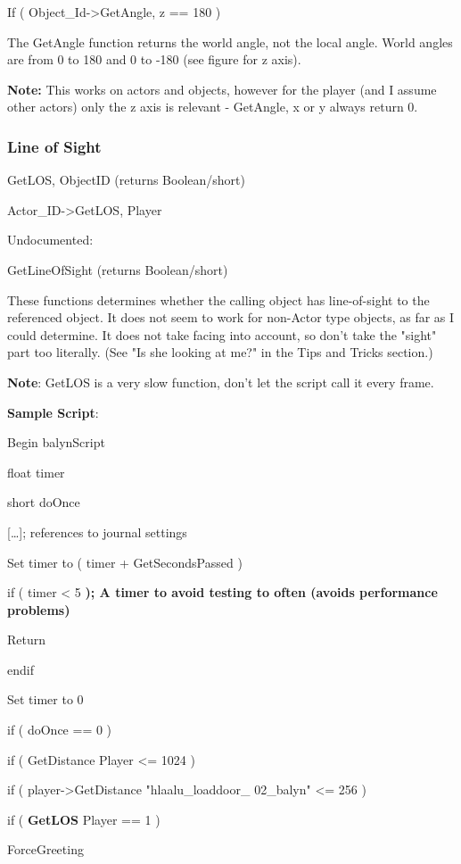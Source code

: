 \documentclass[
]{article}
\begin{document}
If ( Object\_Id-\textgreater GetAngle, z == 180 )

The GetAngle function returns the world angle, not the local angle.
World angles are from 0 to 180 and 0 to -180 (see figure for z axis).

\textbf{Note:} This works on actors and objects, however for the player
(and I assume other actors) only the z axis is relevant - GetAngle, x or
y always return 0.

\hypertarget{line-of-sight}{%
\subsubsection{Line of Sight}\label{line-of-sight}}

GetLOS, ObjectID (returns Boolean/short)

Actor\_ID-\textgreater GetLOS, Player

Undocumented:

GetLineOfSight (returns Boolean/short)

These functions determines whether the calling object has line-of-sight
to the referenced object. It does not seem to work for non-Actor type
objects, as far as I could determine. It does not take facing into
account, so don't take the "sight" part too literally. (See "Is she
looking at me?" in the Tips and Tricks section.)

\textbf{Note}: GetLOS is a very slow function, don't let the script call
it every frame.

\textbf{Sample Script}:

Begin balynScript

float timer

short doOnce

{[}\ldots{]}; references to journal settings

Set timer to ( timer + GetSecondsPassed )

if ( timer \textless{} 5 \textbf{); A timer to avoid testing to often
(avoids performance problems)}

Return

endif

Set timer to 0

if ( doOnce == 0 )

if ( GetDistance Player \textless= 1024 )

if ( player-\textgreater GetDistance "hlaalu\_loaddoor\_ 02\_balyn"
\textless= 256 )

if ( \textbf{GetLOS} Player == 1 )

ForceGreeting
\end{document}
